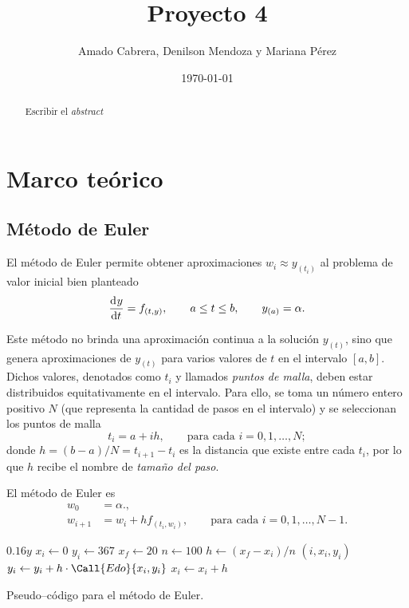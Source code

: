 \documentclass[english,spanish,Ce-table,Ce-theorem]{CabesHW}
\institute{Escuela de Ciencias Físicas y Matemática}
\title{Proyecto 4}
\author{Amado Cabrera, Denilson Mendoza y Mariana Pérez}
\date{\today}
\begin{document}
\maketitle

\begin{abstract}
Escribir el \textit{abstract}
\end{abstract}

\section{Marco teórico}
\subsection{Método de Euler}
El método de Euler permite obtener aproximaciones $w_i \approx y_{(t_i)}$ al problema de valor inicial bien planteado
\[ \td{y}{t} = f_{(t,y)}, \qquad a \leq t \leq b, \qquad y_{(a)} = \alpha. \]

Este método no brinda una aproximación continua a la solución $y_{(t)}$, sino que genera aproximaciones de $y_{(t)}$ para varios valores de $t$ en el intervalo $[a, b]$. Dichos valores, denotados como $t_i$ y llamados \textit{puntos de malla}, deben estar distribuidos equitativamente en el intervalo. Para ello, se toma un número entero positivo $N$ (que representa la cantidad de pasos en el intervalo) y se seleccionan los puntos de malla
\[ t_i = a + ih, \qquad \text{para cada $i = 0, 1, \ldots, N$}; \]
donde $h = (b-a)/N = t_{i+1} - t_i$ es la distancia que existe entre cada $t_i$, por lo que $h$ recibe el nombre de \textit{tamaño del paso}.


El método de Euler es
\begin{align*}
    w_0 &= \alpha.,\\
    w_{i+1} &= w_i + h f_{(t_i, w_i)}, \qquad \text{para cada $i = 0, 1, \ldots, N-1$}.
\end{align*}


\begin{algorithm}[H]
    \centering
    \begin{myalg}[1]
        \State \Output $0.16 y$
    \EndFunction
    \State \phantom{}
    \State $x_i \gets 0$ 
    \State $y_i \gets 367$ 
    \State $x_f \gets 20$ 
    \State $n \gets 100$ 
    \State \phantom{}
    \State $h \gets (x_f - x_i)/n$ 
        \State \Output $(i, x_i, y_i)$
        \State \phantom{}
        \State $y_i \gets y_i + h\cdot\Call{Edo}{x_i, y_i}$
        \State $x_i \gets x_i + h$
    \EndFor
    \end{myalg}
    \caption{Pseudo--código para el método de Euler.}
    \label{alg:euler}
\end{algorithm}
\end{document}
